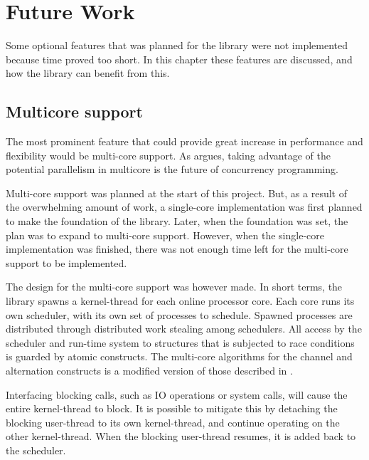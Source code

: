 
\chapter{Future Work}
\label{ch:future_work}

Some optional features that was planned for the library were not implemented because time proved too short. In this chapter these features are discussed, and how the library can benefit from this. 

\section{Multicore support}

The most prominent feature that could provide great increase in performance and flexibility would be multi\hyp{}core support. As \citet{c++csp2} argues, taking advantage of the potential parallelism in multicore is the future of concurrency programming.

Multi\hyp{}core support was planned at the start of this project. But, as a result of the overwhelming amount of work, a single\hyp{}core implementation was first planned to make the foundation of the library. Later, when the foundation was set, the plan was to expand to multi\hyp{}core support. However, when the single\hyp{}core implementation was finished, there was not enough time left for the multi\hyp{}core support to be implemented.

The design for the multi\hyp{}core support was however made. In short terms, the library spawns a kernel\hyp{}thread for each online processor core. Each core runs its own scheduler, with its own set of processes to schedule. Spawned processes are distributed through distributed work stealing among schedulers. All access by the scheduler and run\hyp{}time system to structures that is subjected to race conditions is guarded by atomic constructs. The multi\hyp{}core algorithms for the channel and alternation constructs is a modified version of those described in \citet{c++csp2}.


Interfacing blocking calls, such as IO operations or system calls, will cause the entire kernel\hyp{}thread to block. It is possible to mitigate this by detaching the blocking user\hyp{}thread to its own kernel\hyp{}thread, and continue operating on the other kernel\hyp{}thread. When the blocking user\hyp{}thread resumes, it is added back to the scheduler.

